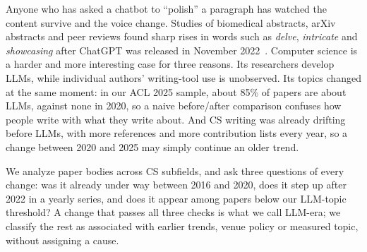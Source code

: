 \documentclass[10pt,twocolumn]{article}
\begin{document}
Anyone who has asked a chatbot to ``polish'' a paragraph has watched the content survive and the voice change. Studies of biomedical abstracts, arXiv abstracts and peer reviews found sharp rises in words such as \textit{delve}, \textit{intricate} and \textit{showcasing} after ChatGPT was released in November 2022~\citep{kobak2024delving,liang2024mapping,liang2024monitoring,geng2024chatgpt}. Computer science is a harder and more interesting case for three reasons. Its researchers develop LLMs, while individual authors' writing-tool use is unobserved. Its topics changed at the same moment: in our ACL 2025 sample, about 85\% of papers are about LLMs, against none in 2020, so a naive before/after comparison confuses how people write with what they write about. And CS writing was already drifting before LLMs, with more references and more contribution lists every year, so a change between 2020 and 2025 may simply continue an older trend.

We analyze paper bodies across CS subfields, and ask three questions of every change: was it already under way between 2016 and 2020, does it step up after 2022 in a yearly series, and does it appear among papers below our LLM-topic threshold? A change that passes all three checks is what we call LLM-era; we classify the rest as associated with earlier trends, venue policy or measured topic, without assigning a cause.
\end{document}

